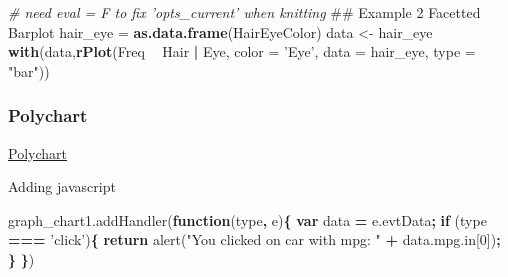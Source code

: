 \documentclass[10,portrait]{article}
\newenvironment{Shaded}{\begin{snugshade}}{\end{snugshade}}
\newcommand{\KeywordTok}[1]{\textcolor[rgb]{0.13,0.29,0.53}{\textbf{#1}}}
\newcommand{\DataTypeTok}[1]{\textcolor[rgb]{0.13,0.29,0.53}{#1}}
\newcommand{\DecValTok}[1]{\textcolor[rgb]{0.00,0.00,0.81}{#1}}
\newcommand{\StringTok}[1]{\textcolor[rgb]{0.31,0.60,0.02}{#1}}
\newcommand{\CommentTok}[1]{\textcolor[rgb]{0.56,0.35,0.01}{\textit{#1}}}
\newcommand{\VariableTok}[1]{\textcolor[rgb]{0.00,0.00,0.00}{#1}}
\newcommand{\ControlFlowTok}[1]{\textcolor[rgb]{0.13,0.29,0.53}{\textbf{#1}}}
\newcommand{\OperatorTok}[1]{\textcolor[rgb]{0.81,0.36,0.00}{\textbf{#1}}}
\newcommand{\AttributeTok}[1]{\textcolor[rgb]{0.77,0.63,0.00}{#1}}
\newcommand{\NormalTok}[1]{#1}
\begin{document}
\begin{Shaded}
\begin{Highlighting}[]
\CommentTok{# need eval = F to fix 'opts_current' when knitting }
\NormalTok{## Example 2 Facetted Barplot}
\NormalTok{hair_eye =}\StringTok{ }\KeywordTok{as.data.frame}\NormalTok{(HairEyeColor)}
\NormalTok{data <-}\StringTok{ }\NormalTok{hair_eye}
\KeywordTok{with}\NormalTok{(data,}\KeywordTok{rPlot}\NormalTok{(Freq }\OperatorTok{~}\StringTok{ }\NormalTok{Hair }\OperatorTok{|}\StringTok{ }\NormalTok{Eye, }\DataTypeTok{color =} \StringTok{'Eye'}\NormalTok{, }\DataTypeTok{data =}\NormalTok{ hair_eye, }\DataTypeTok{type =} \StringTok{"bar"}\NormalTok{))}
\end{Highlighting}
\end{Shaded}

\subsubsection{Polychart}\label{polychart}

\href{https://github.com/Polychart/polychart2}{Polychart}

\begin{Shaded}
\end{Shaded}

Adding javascript

\begin{Shaded}
\begin{Highlighting}[]
\VariableTok{graph_chart1}\NormalTok{.}\AttributeTok{addHandler}\NormalTok{(}\KeywordTok{function}\NormalTok{(type}\OperatorTok{,}\NormalTok{ e)}\OperatorTok{\{}
  \KeywordTok{var}\NormalTok{ data }\OperatorTok{=} \VariableTok{e}\NormalTok{.}\AttributeTok{evtData}\OperatorTok{;}
  \ControlFlowTok{if}\NormalTok{ (type }\OperatorTok{===} \StringTok{'click'}\NormalTok{)}\OperatorTok{\{}
    \ControlFlowTok{return} \AttributeTok{alert}\NormalTok{(}\StringTok{"You clicked on car with mpg: "} \OperatorTok{+} \VariableTok{data}\NormalTok{.}\VariableTok{mpg}\NormalTok{.}\AttributeTok{in}\NormalTok{[}\DecValTok{0}\NormalTok{])}\OperatorTok{;}
  \OperatorTok{\}}
\OperatorTok{\}}\NormalTok{)}
\end{Highlighting}
\end{Shaded}
\end{document}
